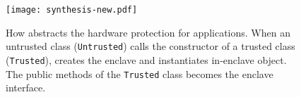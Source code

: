 
 
\begin{figure}[t!]
\centering
\texttt{[image: synthesis-new.pdf]}
\footnotesize
\caption{How \sysname{} abstracts the \sgx{} hardware protection for \java{} applications.
When an untrusted class ({\tt Untrusted}) calls the constructor of a trusted class ({\tt Trusted}),
\sysname{} creates the enclave and instantiates in-enclave object.
The public methods of the {\tt Trusted} class %
becomes the enclave interface.
}
\label{fig:synthesis}
\end{figure}


%



